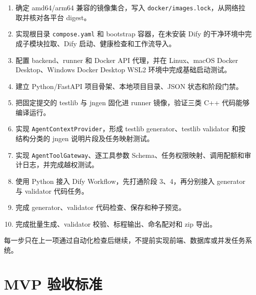 \documentclass[UTF8,zihao=-4]{ctexart}
\begin{document}
\begin{enumerate}
  \item 确定 amd64/arm64 兼容的镜像集合，写入 \texttt{docker/images.lock}，从网络拉取并核对各平台 digest。
  \item 实现根目录 \texttt{compose.yaml} 和 bootstrap 容器，在未安装 Dify 的干净环境中完成子模块拉取、Dify 启动、健康检查和工作流导入。
  \item 配置 backend、runner 和 Docker API 代理，并在 Linux、macOS Docker Desktop、Windows Docker Desktop WSL2 环境中完成基础启动测试。
  \item 建立 Python/FastAPI 项目骨架、本地项目目录、JSON 状态和阶段门禁。
  \item 把固定提交的 testlib 与 jngen 固化进 runner 镜像，验证三类 C++ 代码能够编译运行。
  \item 实现 \texttt{AgentContextProvider}，形成 testlib generator、testlib validator 和按结构分类的 jngen 说明片段及任务映射测试。
  \item 实现 \texttt{AgentToolGateway}、逐工具参数 Schema、任务权限映射、调用配额和审计日志，并完成越权测试。
  \item 使用 Python 接入 Dify Workflow，先打通阶段 3、4，再分别接入 generator 与 validator 代码任务。
  \item 完成 generator、validator 代码检查、保存和种子预览。
  \item 完成批量生成、validator 校验、标程输出、命名配对和 zip 导出。
\end{enumerate}

每一步只在上一项通过自动化检查后继续，不提前实现前端、数据库或并发任务系统。

\section{MVP 验收标准}
\end{document}
